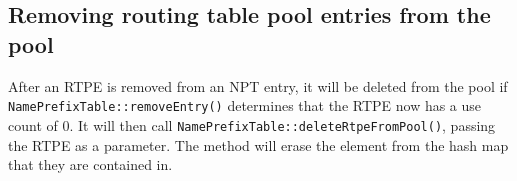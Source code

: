 \subsection{Removing routing table pool entries from the pool}
\label{sec:npt-rtpe-del}
After an RTPE is removed from an NPT entry, it will be deleted from the pool if \texttt{NamePrefixTable::removeEntry()} determines that the RTPE now has a use count of 0.
It will then call \texttt{NamePrefixTable::deleteRtpeFromPool()}, passing the RTPE as a parameter.
The method will erase the element from the hash map that they are contained in.
